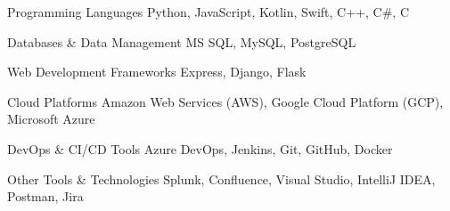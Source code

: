 

\begin{cvskills}

  \cvskill
    {Programming Languages} %
    {Python, JavaScript, Kotlin, Swift, C++, C\#, C} %
    
  \cvskill
    {Databases \& Data Management} %
    {MS SQL, MySQL, PostgreSQL} %

  \cvskill
    {Web Development Frameworks} %
    {Express, Django, Flask} %

  \cvskill
    {Cloud Platforms} %
    {Amazon Web Services (AWS), Google Cloud Platform (GCP), Microsoft Azure} %

  \cvskill
    {DevOps \& CI/CD Tools} %
    {Azure DevOps, Jenkins, Git, GitHub, Docker} %

  \cvskill
    {Other Tools \& Technologies} %
    {Splunk, Confluence, Visual Studio, IntelliJ IDEA, Postman, Jira} %

\end{cvskills}
